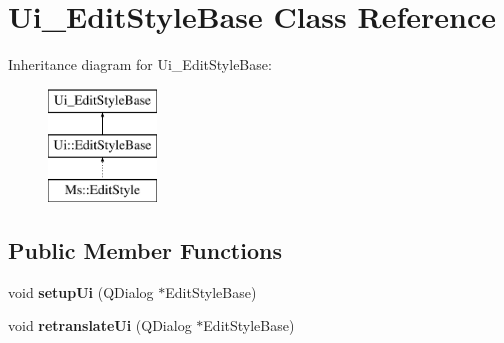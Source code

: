 \hypertarget{class_ui___edit_style_base}{}\section{Ui\+\_\+\+Edit\+Style\+Base Class Reference}
\label{class_ui___edit_style_base}
Inheritance diagram for Ui\+\_\+\+Edit\+Style\+Base\+:\begin{figure}[H]
\begin{center}
\leavevmode
\includegraphics[height=3.000000cm]{class_ui___edit_style_base}
\end{center}
\end{figure}
\subsection*{Public Member Functions}
\begin{DoxyCompactItemize}
\item 
\mbox{\label{class_ui___edit_style_base_af1b9cee0b6f91a17bf7bf5ce7f5f6468}} 
void {\bfseries setup\+Ui} (Q\+Dialog $\ast$Edit\+Style\+Base)
\item 
\mbox{\label{class_ui___edit_style_base_a8a707d530e355250187f6058e9aa1821}} 
void {\bfseries retranslate\+Ui} (Q\+Dialog $\ast$Edit\+Style\+Base)
\end{DoxyCompactItemize}
